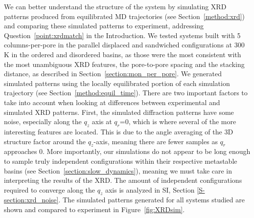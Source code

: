   We can better understand the structure of the system by simulating XRD
  patterns produced from equilibrated MD trajectories (see
  Section~\ref{method:xrd}) and comparing these simulated patterns to experiment,
  addressing Question~\ref{point:xrdmatch} in the Introduction. We tested systems
  built with 5 columns-per-pore in the parallel displaced and sandwiched
  configurations at 300 K in the ordered and disordered basins, as those were the
  most consistent with the most unambiguous XRD features, the pore-to-pore
  spacing and the stacking distance, as described in
  Section~\ref{section:mon_per_pore}.  We generated simulated patterns using the
  locally equilibrated portion of each simulation trajectory (see
  Section~\ref{method:equil_time}). There are two important factors to take into
  account when looking at differences between experimental and simulated XRD
  patterns.  First, the simulated diffraction patterns have some noise,
  especially along the $q_z$ axis at $q_r$=0, which is where several of the more
  interesting features are located. This is due to the angle averaging of the 3D
  structure factor around the $q_z$-axis, meaning there are fewer samples as
  $q_r$ approaches 0.  More importantly, our simulations do not appear to be long
  enough to sample truly independent configurations within their respective
  metastable basins (see Section~\ref{section:slow_dynamics}), meaning we must
  take care in interpreting the results of the XRD. The amount of independent
  configurations required to converge along the $q_z$ axis is analyzed in SI,
  Section \ref{S-section:xrd_noise}. The simulated patterns generated for all
  systems studied are shown and compared to experiment in
  Figure~\ref{fig:XRDsim}.

